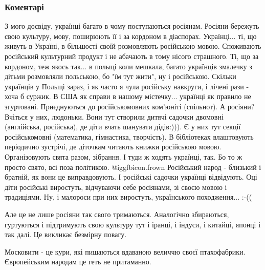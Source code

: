  
 
 
 
 
\subsubsection{Коментарі}

\begin{itemize} %

З мого досвіду, українці багато в чому поступаються росіянам. Росіяни бережуть
свою культуру, мову, поширюють її і за кордоном в діаспорах. Українці... ті, що
живуть в Україні, в більшості своїй розмовляють російською мовою. Споживають
російський культурний продукт і не абачають в тому нісого страшного. Ті, що за
кордоном, теж якось так... в польщі коли мешкала, багато українців змалечку з
дітьми розмовляли польською, бо "їм тут жити", ну і російською. Скільки
українців у Польщі зараз, і як часто я чула російську навкруги, і лічені рази -
хоча б суржик. В США як справи в нашому містечку... українці як правило не
згуртовані. Приєднуються до російськомовних ком'юніті (спільнот). А росіяни?
Вчіться у них, людоньки. Вони тут створили дитячі садочки двомовні (англійська,
російська), де діти вчать шанувати дідів:))). Є у них тут секції російськомовні
(математика, гімнастика, творчість). В бібліотеках влаштовують періодично
зустрічі, де діточкам читають книжки російською мовою. Організовують свята
разом, зібрання. І туди ж ходять українці, так. Бо то ж просто свято, всі поза
політикою. @igg{fbicon.frown}  Російський народ - близький і братній, як вони
це виправдовують. І російські садочки українці відвідують. Оці діти російські
виростуть, відчуваючи себе росіянами, зі своєю мовою і традиціями. Ну, і
малороси при них виростуть, українського походження... :-((

Але це не лише росіяни так свого тримаються. Аналогічно збираються, гуртуються
і підтримують свою культуру тут і іранці, і індуси, і китайці, японці і так
далі. Це викликає безмірну повагу.


Московити - це кури, які пишаються вдаваною величчю своєї птахофабрики.
Європейським народам це геть не притаманно.


\end{itemize}
